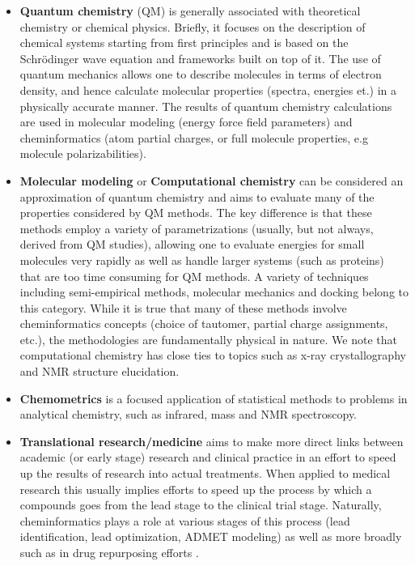 \documentclass{sig-alternate}
\begin{document}
\begin{itemize}
\item \textbf{Quantum chemistry} (QM) is generally associated with
  theoretical chemistry or chemical physics. Briefly, it focuses on
  the description of chemical systems starting from first principles
  and is based on the Schr\"{o}dinger wave equation and frameworks
  built on top of it. The use of quantum mechanics allows one to
  describe molecules in terms of electron density, and hence calculate
  molecular properties (spectra, energies et.) in a physically
  accurate manner.  The results of quantum chemistry calculations are
  used in molecular modeling (energy force field parameters) and
  cheminformatics (atom partial charges, or full molecule properties,
  e.g molecule polarizabilities).
\item \textbf{Molecular modeling} or \textbf{Computational chemistry}
  can be considered an approximation of quantum chemistry and aims to
  evaluate many of the properties considered by QM methods. The key
  difference is that these methods employ a variety of
  parametrizations (usually, but not always, derived from QM studies),
  allowing one to evaluate energies for small molecules very rapidly
  as well as handle larger systems (such as proteins) that are too
  time consuming for QM methods. A variety of techniques including
  semi-empirical methods, molecular mechanics and docking belong to
  this category. While it is true that many of these methods involve
  cheminformatics concepts (choice of tautomer, partial charge
  assignments, etc.), the methodologies are fundamentally physical in
  nature. We note that computational chemistry has close ties to
  topics such as x-ray crystallography and NMR structure elucidation.
\item \textbf{Chemometrics} is a focused application of statistical
  methods to problems in analytical chemistry, such as infrared, mass
  and NMR spectroscopy.
\item \textbf{Translational research/medicine} aims to make more
  direct links between academic (or early stage) research and clinical
  practice in an effort to speed up the results of research into
  actual treatments. When applied to medical research this usually
  implies efforts to speed up the process by which a compounds goes
  from the lead stage to the clinical trial stage. Naturally,
  cheminformatics plays a role at various stages of this process (lead
  identification, lead optimization, ADMET modeling) as well as more
  broadly such as in drug repurposing
  efforts \cite{Dudley:2011fk,Swamidass:2011uq}.
\end{itemize}
\end{document}
